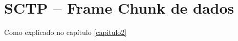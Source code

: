 \chapter{SCTP – Frame Chunk de dados} \label{capitulo3}

Como explicado no capítulo \ref{capitulo2}
